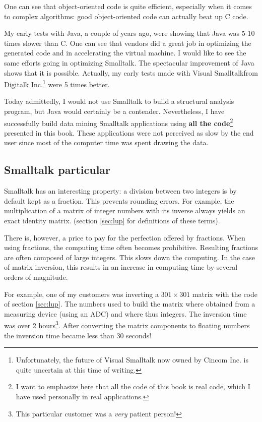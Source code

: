 \documentclass[twoside]{book}
\begin{document}
One can see that object-oriented code is quite efficient,
especially when it comes to complex algorithms: good
object-oriented code can actually beat up C code.

My early tests with Java, a couple of years ago, were showing that
Java was 5-10 times slower than C. One can see that vendors did a
great job in optimizing the generated code and in accelerating the
virtual machine. I would like to see the same efforts going in
optimizing Smalltalk. The spectacular improvement of Java shows
that it is possible. Actually, my early tests made with Visual
Smalltalk\tm from Digitalk Inc.\footnote{Unfortunately, the future
of Visual Smalltalk now owned by Cincom Inc. is quite uncertain at
this time of writing.} were 5 times better.

Today admittedly, I would not use Smalltalk to build a structural
analysis program, but Java would certainly be a contender.
Nevertheless, I have successfully build data mining Smalltalk
applications using {\bf all the code}\footnote{I want to emphasize
here that all the code of this book is real code, which I have
used personally in real applications.} presented in this book.
These applications were not perceived as slow by the end user
since most of the computer time was spent drawing the data.

\subsection{Smalltalk particular}
Smalltalk has an interesting property: a division between two
integers is by default kept as a fraction. This prevents rounding
errors. For example, the multiplication of a matrix of integer
numbers with its inverse always yields an exact identity matrix.
(\cf section \ref{sec:lup} for definitions of these terms).

There is, however, a price to pay for the perfection offered by
fractions. When using fractions, the computing time often becomes
prohibitive. Resulting fractions are often composed of large
integers. This slows down the computing. In the case of matrix
inversion, this results in an increase in computing time by
several orders of magnitude.

For example, one of my customers was inverting a $301\times 301$
matrix with the code of section \ref{sec:lup}. The numbers used to
build the matrix where obtained from a measuring device (using an
ADC) and where thus integers. The inversion time was over 2
hours\footnote{This particular customer was a {\sl very} patient
person!}. After converting the matrix components to floating
numbers the inversion time became less than 30 seconds!
\end{document}
